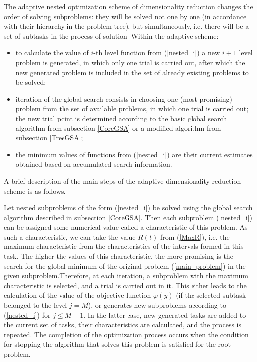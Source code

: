 \documentclass[entropy,article,submit,moreauthors,pdftex]{Definitions/mdpi}
\begin{document}
The adaptive nested optimization scheme of dimensionality reduction changes the order of solving subproblems: they will be solved not one by one (in accordance with their hierarchy in the problem tree), but simultaneously, i.e. there will be a set of subtasks in the process of solution. Within the adaptive scheme:
\begin{itemize}
	\item 
to calculate the value of $i$-th level function from (\ref{nested_i}) a new $i+1$ level problem is generated, in which only one trial is carried out, after which the new generated problem is included in the set of already existing problems to be solved;
	\item 
	iteration of the global search consists in choosing one (most promising) problem from the set of available problems, in which one trial is carried out; the new trial point is determined according to the basic global search algorithm from subsection \ref{CoreGSA} or a modified algorithm from subsection  \ref{TreeGSA};
	\item
the minimum values of functions from  (\ref{nested_i}) are their current estimates obtained based on accumulated search information.
\end{itemize}

A brief description of the main steps of the adaptive dimensionality reduction scheme is as follows.

Let nested subproblems of the form (\ref{nested_i}) be solved using the global search algorithm described in subsection  \ref{CoreGSA}. Then each subproblem  (\ref{nested_i})  can be assigned some numerical value called a characteristic of this problem. As such a characteristic, we can take the value $R(t)$ from (\ref{MaxR}), i.e. the maximum characteristic from the characteristics of the intervals formed in this task. The higher the values of this characteristic, the more promising is the search for the global minimum of the original problem (\ref{main_problem}) in the given subproblem.Therefore, at each iteration, a subproblem with the maximum characteristic is selected, and a trial is carried out in it. This either leads to the calculation of the value of the objective function  $\varphi(y)$ (if the selected subtask belonged to the level  $j=M$), or generates new subproblems according to (\ref{nested_i}) for $j\leq M-1$. In the latter case, new generated tasks are added to the current set of tasks, their characteristics are calculated, and the process is repeated. The completion of the optimization process occurs when the condition for stopping the algorithm that solves this problem is satisfied for the root problem.
\end{document}
